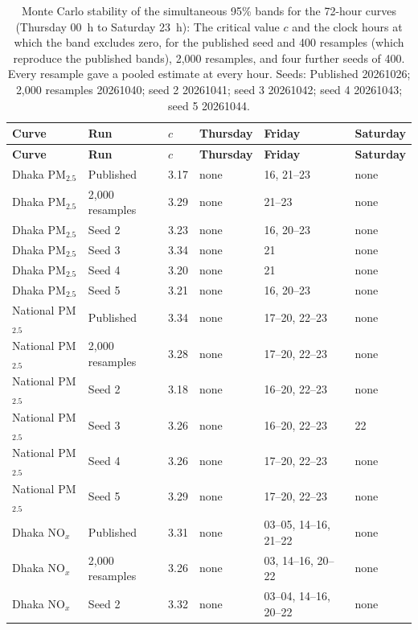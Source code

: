 \begingroup\scriptsize
\begin{longtable}{L{2.6cm} L{2.4cm} C{0.9cm} L{2.0cm} L{3.6cm} L{2.0cm}}
\caption{Monte Carlo stability of the simultaneous 95\% bands for the 72-hour curves (Thursday 00~h to Saturday 23~h): The critical value $c$ and the clock hours at which the band excludes zero, for the published seed and 400 resamples (which reproduce the published bands), 2,000 resamples, and four further seeds of 400. Every resample gave a pooled estimate at every hour. Seeds: Published 20261026; 2,000 resamples 20261040; seed 2 20261041; seed 3 20261042; seed 4 20261043; seed 5 20261044.}\label{tab:s-stability-hourly}\\
\toprule
\textbf{Curve} & \textbf{Run} & \textbf{$c$} & \textbf{Thursday} & \textbf{Friday} & \textbf{Saturday} \\
\midrule\endfirsthead
\toprule
\textbf{Curve} & \textbf{Run} & \textbf{$c$} & \textbf{Thursday} & \textbf{Friday} & \textbf{Saturday} \\
\midrule\endhead
\bottomrule\endfoot
Dhaka PM$_{2.5}$ & Published & 3.17 & none & 16, 21--23 & none \\
Dhaka PM$_{2.5}$ & 2,000 resamples & 3.29 & none & 21--23 & none \\
Dhaka PM$_{2.5}$ & Seed 2 & 3.23 & none & 16, 20--23 & none \\
Dhaka PM$_{2.5}$ & Seed 3 & 3.34 & none & 21 & none \\
Dhaka PM$_{2.5}$ & Seed 4 & 3.20 & none & 21 & none \\
Dhaka PM$_{2.5}$ & Seed 5 & 3.21 & none & 16, 20--23 & none \\
National PM$_{2.5}$ & Published & 3.34 & none & 17--20, 22--23 & none \\
National PM$_{2.5}$ & 2,000 resamples & 3.28 & none & 17--20, 22--23 & none \\
National PM$_{2.5}$ & Seed 2 & 3.18 & none & 16--20, 22--23 & none \\
National PM$_{2.5}$ & Seed 3 & 3.26 & none & 16--20, 22--23 & 22 \\
National PM$_{2.5}$ & Seed 4 & 3.26 & none & 17--20, 22--23 & none \\
National PM$_{2.5}$ & Seed 5 & 3.29 & none & 17--20, 22--23 & none \\
Dhaka NO$_x$ & Published & 3.31 & none & 03--05, 14--16, 21--22 & none \\
Dhaka NO$_x$ & 2,000 resamples & 3.26 & none & 03, 14--16, 20--22 & none \\
Dhaka NO$_x$ & Seed 2 & 3.32 & none & 03--04, 14--16, 20--22 & none \\

\end{longtable}
